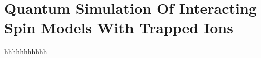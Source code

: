 \section{Quantum Simulation Of Interacting Spin Models With Trapped Ions} %
\label{sec:quantum_simulation_of_interacting_spin_models_with_trapped_ions}
hhhhhhhhhhh


